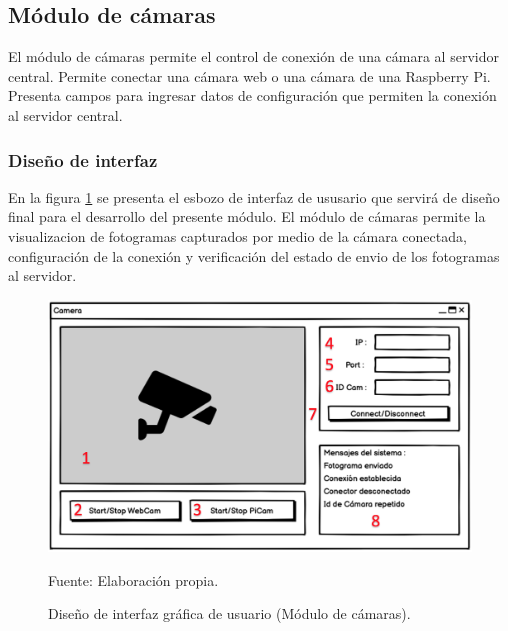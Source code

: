 \subsection{Módulo de cámaras}
El módulo de cámaras permite el control de conexión de una cámara al servidor central. Permite conectar una cámara web o una cámara de  una Raspberry Pi. Presenta campos para ingresar datos de configuración que permiten la conexión al servidor central.\\

\subsubsection{Diseño de interfaz}
En la figura \ref{fig:cam_user_interface} se presenta el esbozo de interfaz de ususario que servirá de diseño final para el desarrollo del presente módulo. El módulo de cámaras permite la visualizacion de fotogramas capturados por medio de la cámara conectada, configuración de la conexión y verificación del estado de envio de los fotogramas al servidor.

\begin{figure}[H]
    \begin{center}
        \includegraphics[width=13cm]{img/capitulo_4/camera_interface.png}
    \end{center}
    \begin{center}
        \caption{Diseño de interfaz gráfica de usuario (Módulo de cámaras).}
        Fuente: Elaboración propia.
        \label{fig:cam_user_interface}
    \end{center}
\end{figure}

